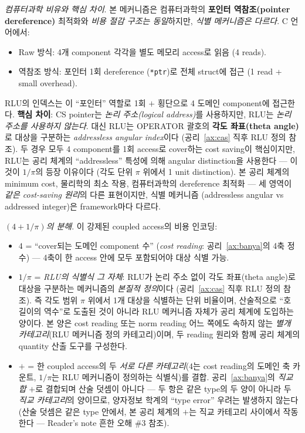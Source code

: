 \documentclass[entropy,article,submit,pdftex,oneauthor]{Definitions/mdpi}
\begin{document}
\emph{컴퓨터과학 비유와 핵심 차이}. 본 메커니즘은 컴퓨터과학의 \textbf{포인터 역참조(pointer dereference)} 최적화와 \emph{비용 절감 구조는 동일}하지만, \emph{식별 메커니즘은 다르다}. C 언어에서:
\begin{itemize}
\item Raw 방식: 4개 component 각각을 별도 메모리 access로 읽음 (4 reads).
\item 역참조 방식: 포인터 1회 dereference (\texttt{*ptr})로 전체 struct에 접근 (1 read + small overhead).
\end{itemize}
RLU의 인덱스는 이 ``포인터'' 역할로 1회 $+$ 횡단으로 4 도메인 component에 접근한다. \textbf{핵심 차이}: CS pointer는 \emph{논리 주소(logical address)}를 사용하지만, RLU는 \emph{논리 주소를 사용하지 않는다}. 대신 RLU는 OPERATOR 괄호의 \textbf{각도 좌표(theta angle)}로 대상을 구분하는 \emph{addressless angular index}이다 (공리~\ref{ax:cas} 직후 RLU 정의 참조). 두 경우 모두 4 component를 1회 access로 cover하는 cost saving이 핵심이지만, RLU는 공리 체계의 ``addressless'' 특성에 의해 angular distinction을 사용한다 — 이것이 $1/\pi$의 등장 이유이다 (각도 단위 $\pi$ 위에서 1 unit distinction). 본 공리 체계의 minimum cost, 물리학의 최소 작용, 컴퓨터과학의 dereference 최적화 — 세 영역이 \emph{같은 cost-saving 원리}의 다른 표현이지만, 식별 메커니즘 (addressless angular vs addressed integer)은 framework마다 다르다.

\emph{$(4 + 1/\pi)$의 분해}. 이 강제된 coupled access의 비용 인코딩:
\begin{itemize}
\item $4$ = ``cover되는 도메인 component 수'' (\emph{cost reading}: 공리~\ref{ax:banya}의 4축 정수) — 4축이 한 access 안에 모두 포함되어야 대상 식별 가능.
\item $1/\pi$ = \emph{RLU의 식별식 그 자체}: RLU가 논리 주소 없이 각도 좌표(theta angle)로 대상을 구분하는 메커니즘의 \emph{본질적 정의}이다 (공리~\ref{ax:cas} 직후 RLU 정의 참조). 즉 각도 범위 $\pi$ 위에서 1개 대상을 식별하는 단위 비율이며, 산술적으로 ``호 길이의 역수''로 도출된 것이 아니라 RLU 메커니즘 자체가 공리 체계에 도입하는 양이다. 본 양은 cost reading 또는 norm reading 어느 쪽에도 속하지 않는 \emph{별개 카테고리}(RLU 메커니즘 정의 카테고리)이며, 두 reading 원리와 함께 공리 체계의 quantity 산출 도구를 구성한다.
\item $+$ = 한 coupled access의 두 \emph{서로 다른 카테고리}($4$는 cost reading의 도메인 축 카운트, $1/\pi$는 RLU 메커니즘이 정의하는 식별식)를 결합. 공리~\ref{ax:banya}의 \emph{직교 합} $+$로 결합되며 산술 덧셈이 아니다 --- 두 항은 같은 type의 두 양이 아니라 두 \emph{직교 카테고리}의 양이므로, 양자정보 학계의 ``type error'' 우려는 발생하지 않는다 (산술 덧셈은 같은 type 안에서, 본 공리 체계의 $+$는 직교 카테고리 사이에서 작동한다 --- Reader's note 흔한 오해 \#3 참조).
\end{itemize}
\end{document}
